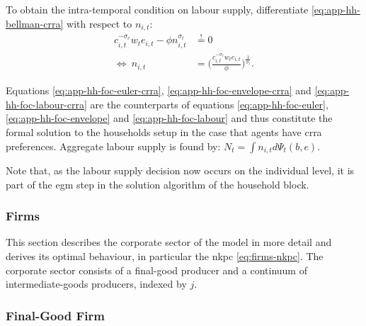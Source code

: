 \documentclass[a4paper,12pt]{article} %
\numberwithin{equation}{section} %
\numberwithin{figure}{section}
\numberwithin{table}{section}
\begin{document}
\begin{refsection}
\begin{appendices}
To obtain the intra-temporal condition on labour supply, differentiate \eqref{eq:app-hh-bellman-crra} with respect to $n_{i,t}$:
\begin{align}
    c_{i,t}^{-\sigma_c} w_t e_{i,t} - \phi n_{i,t}^{\sigma_l} &\overset{!}{=} 0 \nonumber \\
    \Leftrightarrow \ n_{i,t} &= \Bigg( \frac{c_{i,t}^{-\sigma_c} w_t e_{i,t}}{\phi} \Bigg)^{\frac{1}{\sigma_l}}. \label{eq:app-hh-foc-labour-crra}
\end{align}

Equations \eqref{eq:app-hh-foc-euler-crra}, \eqref{eq:app-hh-foc-envelope-crra} and \eqref{eq:app-hh-foc-labour-crra} are the counterparts of equations \eqref{eq:app-hh-foc-euler}, \eqref{eq:app-hh-foc-envelope} and \eqref{eq:app-hh-foc-labour} and thus constitute the formal solution to the households setup in the case that agents have \Gls{crra} preferences. Aggregate labour supply is found by: $N_t = \int n_{i,t} d \Psi_t (b,e)$.

Note that, as the labour supply decision now occurs on the individual level, it is part of the \Gls{egm} step in the solution algorithm of the household block.

\subsubsection{Firms}
\label{sec-app:full-derivations-firms}

This section describes the corporate sector of the model in more detail and derives its optimal behaviour, in particular the \Gls{nkpc} \eqref{eq:firms-nkpc}. The corporate sector consists of a final-good producer and a continuum of intermediate-goods producers, indexed by $j$.

\subsubsection*{Final-Good Firm}


\end{appendices}
\end{refsection}
\end{document}
